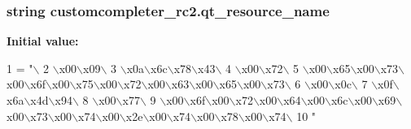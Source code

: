 \subsubsection[{qt\+\_\+resource\+\_\+name}]{\setlength{\rightskip}{0pt plus 5cm}string customcompleter\+\_\+rc2.\+qt\+\_\+resource\+\_\+name}\label{namespacecustomcompleter__rc2_aa070a7e6a40a68ea78d854a96296fd8a}
{\bfseries Initial value\+:}
\begin{DoxyCode}
1 = \textcolor{stringliteral}{"\(\backslash\)}
2 \textcolor{stringliteral}{\(\backslash\)x00\(\backslash\)x09\(\backslash\)}
3 \textcolor{stringliteral}{\(\backslash\)x0a\(\backslash\)x6c\(\backslash\)x78\(\backslash\)x43\(\backslash\)}
4 \textcolor{stringliteral}{\(\backslash\)x00\(\backslash\)x72\(\backslash\)}
5 \textcolor{stringliteral}{\(\backslash\)x00\(\backslash\)x65\(\backslash\)x00\(\backslash\)x73\(\backslash\)x00\(\backslash\)x6f\(\backslash\)x00\(\backslash\)x75\(\backslash\)x00\(\backslash\)x72\(\backslash\)x00\(\backslash\)x63\(\backslash\)x00\(\backslash\)x65\(\backslash\)x00\(\backslash\)x73\(\backslash\)}
6 \textcolor{stringliteral}{\(\backslash\)x00\(\backslash\)x0c\(\backslash\)}
7 \textcolor{stringliteral}{\(\backslash\)x0f\(\backslash\)x6a\(\backslash\)x4d\(\backslash\)x94\(\backslash\)}
8 \textcolor{stringliteral}{\(\backslash\)x00\(\backslash\)x77\(\backslash\)}
9 \textcolor{stringliteral}{\(\backslash\)x00\(\backslash\)x6f\(\backslash\)x00\(\backslash\)x72\(\backslash\)x00\(\backslash\)x64\(\backslash\)x00\(\backslash\)x6c\(\backslash\)x00\(\backslash\)x69\(\backslash\)x00\(\backslash\)x73\(\backslash\)x00\(\backslash\)x74\(\backslash\)x00\(\backslash\)x2e\(\backslash\)x00\(\backslash\)x74\(\backslash\)x00\(\backslash\)x78\(\backslash\)x00\(\backslash\)x74\(\backslash\)}
10 \textcolor{stringliteral}{"}
\end{DoxyCode}
\hypertarget{namespacecustomcompleter__rc2_a861b22cb25a30e46fbe567b07ac52269}{}
